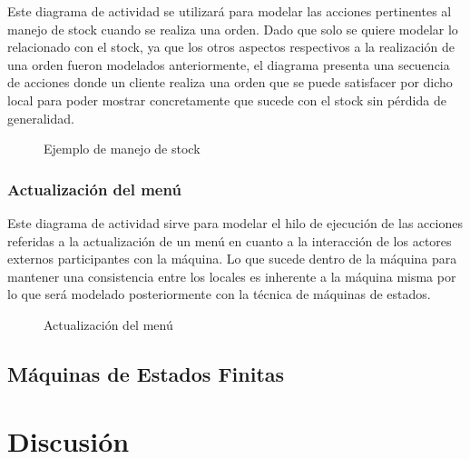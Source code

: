 \documentclass[a4paper,10pt]{article}
\begin{document}
Este diagrama de actividad se utilizar\'a para modelar las acciones pertinentes al manejo de stock cuando se realiza una orden. Dado que solo
se quiere modelar lo relacionado con el stock, ya que los otros aspectos respectivos a la realizaci\'on de una orden fueron modelados anteriormente,
el diagrama presenta una secuencia de acciones donde un cliente realiza una orden que se puede satisfacer por dicho local para poder mostrar concretamente
que sucede con el stock sin p\'erdida de generalidad.

\begin{figure}[H]
\centering
{}
\caption{Ejemplo de manejo de stock}
\end{figure}

\bigskip

\subsubsection*{Actualizaci\'on del men\'u}

Este diagrama de actividad sirve para modelar el hilo de ejecuci\'on de las acciones referidas a la actualizaci\'on de un men\'u en cuanto a la interacci\'on
de los actores externos participantes con la m\'aquina. Lo que sucede dentro de la m\'aquina para mantener una consistencia entre los locales es inherente
a la m\'aquina misma por lo que ser\'a modelado posteriormente con la t\'ecnica de m\'aquinas de estados.

\begin{figure}[H]
\centering
{}
\caption{Actualizaci\'on del men\'u}
\end{figure}


\bigskip

\subsection*{M\'aquinas de Estados Finitas}


\newpage


\section*{Discusi\'on}
\end{document}
